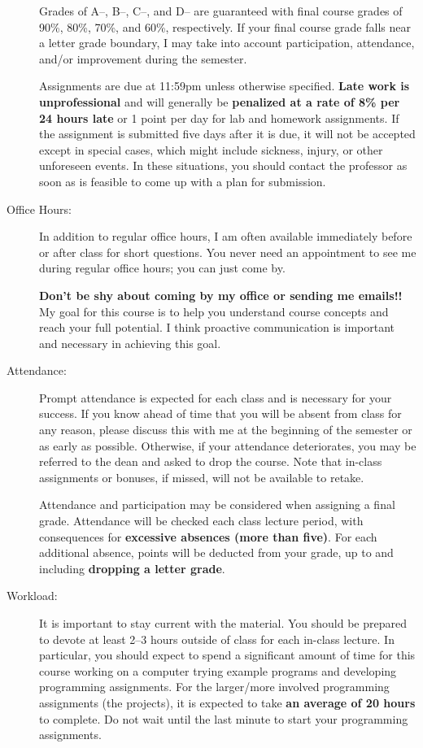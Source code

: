 \documentclass [letterpaper,11pt]{article}
\begin{document}
\begin{description}
Grades of A--, B--, C--, and D-- are guaranteed with final course grades of 90\%, 80\%,
70\%, and 60\%, respectively.  If your final course grade falls near a letter grade boundary,
I may take into account participation, attendance, and/or improvement during the semester.

Assignments are due at 11:59pm unless otherwise specified.  \textbf{Late work
is unprofessional} and will generally be \textbf{penalized at a rate of 8\% per 24 hours late} or 1 point per day for lab and homework assignments.  If the assignment is submitted five days after it is due, it will not be accepted except in special cases, which might include sickness, injury, or other unforeseen events. In these situations, you should contact the professor as soon as is feasible to come up with a plan for submission.

\item[Office Hours:]
In addition to regular office hours, I am often available immediately before or after class for 
short questions.  You never need an appointment to see me during regular office hours; you
can just come by.  

\textbf{Don't be shy about coming by my office or sending me emails!!}  My goal for this course is to help you understand course concepts and reach your full potential. I think proactive communication is important and necessary in achieving this goal.


\item[Attendance:]
Prompt attendance is expected for each class and is necessary for your success. If you know ahead of time that you will be
absent from class for any reason, please discuss this with me at the beginning of the semester
or as early as possible. Otherwise, if your attendance deteriorates, you may be referred to the dean and asked to drop the course. Note that in-class assignments or bonuses, if missed, will not be available to retake.

Attendance and participation may be considered when assigning a final grade.
Attendance will be checked each class lecture period, with consequences for \textbf{excessive absences (more than five)}.  For each additional absence, points will be deducted from your grade, up to and including \textbf{dropping a letter grade}.


\item[Workload:]
It is important to stay current with the material.  You should be prepared to devote  at least 2--3 hours outside of class for each in-class lecture.  In particular, you should expect to spend a significant amount of time for this course working on a computer trying example programs and developing programming assignments. For the larger/more involved programming assignments (the projects), it is expected to take \textbf{an average of 20 hours} to complete. Do not wait until the last minute to start your programming assignments. 


\end{description}
\end{document}

